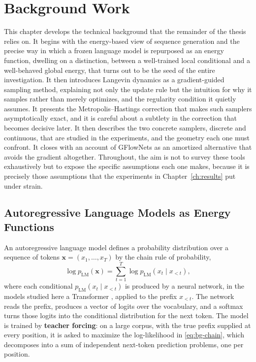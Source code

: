 \chapter{Background Work}
\label{ch:background}

This chapter develops the technical background that the remainder of the thesis relies on. It begins with the energy-based view of sequence generation and the precise way in which a frozen language model is repurposed as an energy function, dwelling on a distinction, between a well-trained local conditional and a well-behaved global energy, that turns out to be the seed of the entire investigation. It then introduces Langevin dynamics as a gradient-guided sampling method, explaining not only the update rule but the intuition for why it samples rather than merely optimizes, and the regularity condition it quietly assumes. It presents the Metropolis--Hastings correction that makes such samplers asymptotically exact, and it is careful about a subtlety in the correction that becomes decisive later. It then describes the two concrete samplers, discrete and continuous, that are studied in the experiments, and the geometry each one must confront. It closes with an account of GFlowNets as an amortized alternative that avoids the gradient altogether. Throughout, the aim is not to survey these tools exhaustively but to expose the specific assumptions each one makes, because it is precisely those assumptions that the experiments in Chapter~\ref{ch:results} put under strain.

\section{Autoregressive Language Models as Energy Functions}
\label{sec:bg-ebm}

An autoregressive language model defines a probability distribution over a sequence of tokens $\bm{x} = (x_1, \dots, x_T)$ by the chain rule of probability,
\begin{equation}
    \log p_{\text{LM}}(\bm{x}) = \sum_{t=1}^{T} \log p_{\text{LM}}(x_t \mid x_{<t}),
    \label{eq:bg-chain}
\end{equation}
where each conditional $p_{\text{LM}}(x_t \mid x_{<t})$ is produced by a neural network, in the models studied here a Transformer \citep{vaswani2017attention}, applied to the prefix $x_{<t}$. The network reads the prefix, produces a vector of logits over the vocabulary, and a softmax turns those logits into the conditional distribution for the next token. The model is trained by \textbf{teacher forcing}: on a large corpus, with the true prefix supplied at every position, it is asked to maximize the log-likelihood in \eqref{eq:bg-chain}, which decomposes into a sum of independent next-token prediction problems, one per position.

